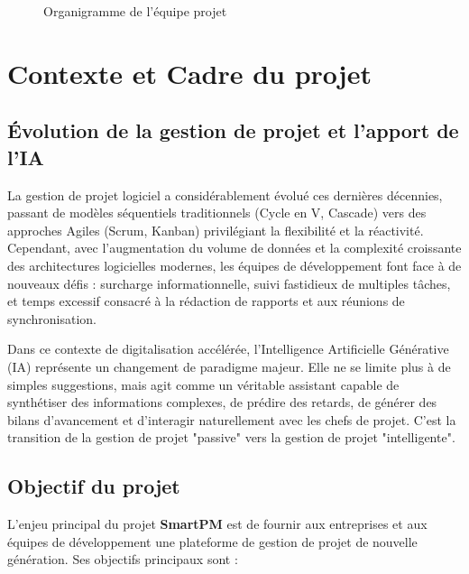 \begin{figure}[H]
  \caption{Organigramme de l'\'equipe projet}
  \label{fig:organigramme}
\end{figure}


\section{Contexte et Cadre du projet}
\label{sec:cadre}

\subsection{Évolution de la gestion de projet et l'apport de l'IA}

La gestion de projet logiciel a considérablement évolué ces dernières décennies, passant de 
modèles séquentiels traditionnels (Cycle en V, Cascade) vers des approches Agiles (Scrum, Kanban) 
privilégiant la flexibilité et la réactivité. Cependant, avec l'augmentation du volume de données 
et la complexité croissante des architectures logicielles modernes, les équipes de développement font face à de nouveaux défis :
surcharge informationnelle, suivi fastidieux de multiples tâches, et temps excessif consacré à la rédaction 
de rapports et aux réunions de synchronisation.

Dans ce contexte de digitalisation accélérée, l'Intelligence Artificielle Générative (IA) 
représente un changement de paradigme majeur. Elle ne se limite plus à de simples suggestions, 
mais agit comme un véritable assistant capable de synthétiser des informations complexes, de 
prédire des retards, de générer des bilans d'avancement et d'interagir naturellement avec les 
chefs de projet. C'est la transition de la gestion de projet "passive" vers la gestion de projet "intelligente".

\subsection{Objectif du projet}

L'enjeu principal du projet \textbf{SmartPM} est de fournir aux entreprises et aux équipes de 
développement une plateforme de gestion de projet de nouvelle génération. Ses objectifs principaux sont :

